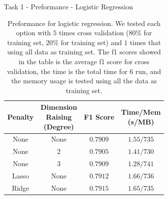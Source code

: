 \documentclass{beamer}
\begin{document}
\begin{frame}{Task 1 - Preformance - Logistic Regression}

  \begin{table}[H]
    \centering
    \begin{tabular}{|c|c|c|c|}
      \hline
      Penalty & \makecell{Dimension                         \\ Raising \\ (Degree)} & F1 Score & \makecell{Time/Mem \\ (s/MB)} \\
      \hline
      None    & None                & $0.7909$ & $1.55/735$ \\
      \hline
      None    & $2$                 & $0.7905$ & $1.41/730$ \\
      \hline
      None    & $3$                 & $0.7909$ & $1.28/741$ \\
      \hline
      Lasso   & None                & $0.7912$ & $1.66/736$ \\
      \hline
      Ridge   & None                & $0.7915$ & $1.65/735$ \\
      \hline
    \end{tabular}
    \caption{Preformance for logistic regression. We tested each option with $5$ times cross validation ($80\%$ for training set, $20\%$ for training set) and $1$ times that using all data as training set. The f1 scores showed in the table is the average f1 score for cross validation, the time is the total time for $6$ run, and the memory usage is tested using all the data as training set.}
  \end{table}

\end{frame}
\end{document}
